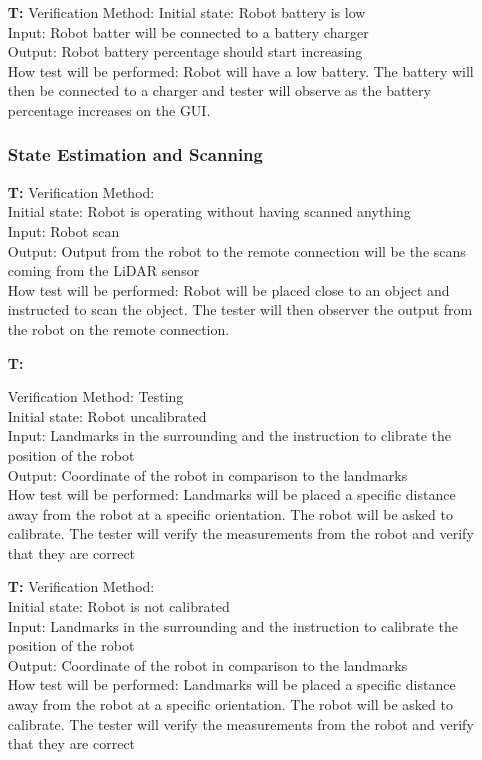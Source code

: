 \documentclass[12pt, titlepage]{article}
\newcounter{tnum} %
\begin{document}
\begin{itemize}
\item[\textbf{T\refstepcounter{tnum}\thetnum:}]
Verification Method: 
Initial state: Robot battery is low \\
Input: Robot batter will be connected to a battery charger \\
Output: Robot battery percentage should start increasing \\
How test will be performed: Robot will have a low battery. The battery will then be connected to a charger and tester will observe as the battery percentage increases on the GUI.\\

\subsubsection{State Estimation and Scanning}

\item[\textbf{T\refstepcounter{tnum}\thetnum:}]
Verification Method: \\
Initial state: Robot is operating without having scanned anything \\
Input: Robot scan\\
Output: Output from the robot to the remote connection will be the scans coming from the LiDAR sensor\\
How test will be performed: Robot will be placed close to an object and instructed to scan the object. The tester will then observer the output from the robot on the remote connection. \\

\item[\textbf{T\refstepcounter{tnum}\thetnum:}]

Verification Method: Testing	\\
Initial state: Robot uncalibrated \\
Input: Landmarks in the surrounding and the instruction to clibrate the position of the robot \\
Output: Coordinate of the robot in comparison to the landmarks\\
How test will be performed: Landmarks will be placed a specific distance away from the robot at a specific orientation. The robot will be asked to calibrate. The tester will verify the measurements from the robot and verify that they are correct \\

\item[\textbf{T\refstepcounter{tnum}\thetnum:}]
Verification Method:\\
Initial state: Robot is not calibrated \\
Input: Landmarks in the surrounding and the instruction to calibrate the position of the robot \\
Output: Coordinate of the robot in comparison to the landmarks\\
How test will be performed: Landmarks will be placed a specific distance away from the robot at a specific orientation. The robot will be asked to calibrate. The tester will verify the measurements from the robot and verify that they are correct \\


\end{itemize}
\end{document}
